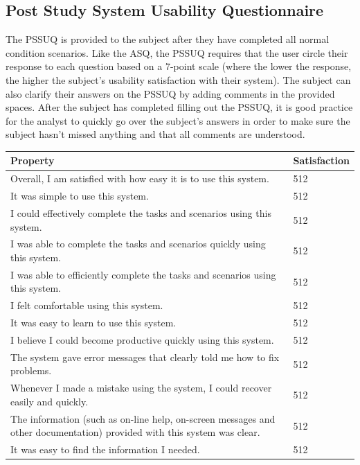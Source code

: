 \subsection{Post Study System Usability Questionnaire}
The PSSUQ is provided to the subject after they have completed all normal condition scenarios. Like the ASQ, the PSSUQ requires that the user circle their response to each question based on a 7-point scale (where the lower the response, the higher the subject’s usability satisfaction with their system). The subject can also clarify their answers on the PSSUQ by adding comments in the provided spaces.
After the subject has completed filling out the PSSUQ, it is good practice for the analyst to quickly go over the subject’s answers in order to make sure the subject hasn’t missed anything and that all comments are understood.
\begin{table}[h]
	\begin{center}
		\begin{tabular}{| l | l | }
			\hline
			\textbf{Property} & \textbf{Satisfaction} \\
			\hline
			Overall, I am satisfied with how easy it is to use this system. & 512  \\
			\hline
			It was simple to use this system. & 512  \\
			\hline
			I could effectively complete the tasks and scenarios using this system. & 512  \\
			\hline
			I was able to complete the tasks and scenarios quickly using this system. & 512  \\
			\hline
			I was able to efficiently complete the tasks and scenarios using this system. & 512  \\
			\hline
			I felt comfortable using this system. & 512  \\
			\hline
			It was easy to learn to use this system. & 512  \\
			\hline
			I believe I could become productive quickly using this system. & 512  \\
			\hline
			The system gave error messages that clearly told me how to fix problems. & 512  \\
			\hline
			Whenever I made a mistake using the system, I could recover easily and quickly. & 512  \\
			\hline
			The information (such as on-line help, on-screen messages and other documentation) provided with this system was clear. & 512  \\
			\hline
			It was easy to find the information I needed. & 512  \\

\end{tabular}
\end{center}
\end{table}
